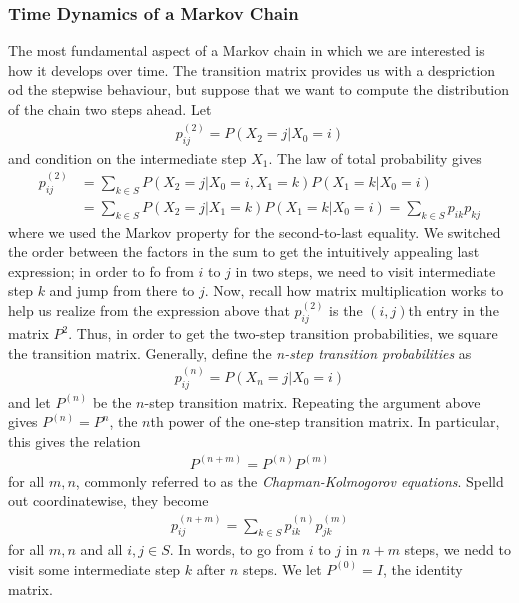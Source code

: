 \subsubsection{Time Dynamics of a Markov Chain}
The most fundamental aspect of a Markov chain in which we are interested is how it develops over time.
The transition matrix provides us with a despriction od the stepwise behaviour, but suppose that we want to compute the distribution of the chain two steps ahead. Let
\begin{align*}
  p_{ij}^{(2)} = P(X_2 = j | X_0 = i)
\end{align*}
and condition on the intermediate step $X_1$. The law of total probability gives
\begin{align*}
  p_{ij}^{(2)} &= \sum_{k \in S} P(X_2 = j | X_0 = i, X_1 = k)
  P(X_1 = k | X_0 = i) \\
  &=\sum_{k \in S} P(X_2 = j | X_1 = k) P(X_1 = k | X_0 = i) =
  \sum_{k \in S} p_{ik}p_{kj}
\end{align*}
where we used the Markov property for the second-to-last equality. We switched the order between the factors in the sum to get the intuitively appealing last expression; in order to fo from $i$ to $j$ in two steps, we need to visit intermediate step $k$ and jump from there to $j$. Now, recall how matrix multiplication works to help us realize from the expression above that $p_{ij}^{(2)}$ is the $(i, j)$th entry in the matrix $P^2$. Thus, in order to get the two-step transition probabilities, we square the transition matrix. Generally, define the \textit{n-step transition probabilities} as
\begin{align*}
  p_{ij}^{(n)} = P(X_n = j | X_0 = i)
\end{align*}
and let $P^{(n)}$ be the $n$-step transition matrix. Repeating the argument above gives $P^{(n)} = P^n$, the $n$th power of the one-step transition matrix. In particular, this gives the relation
\begin{align*}
  P^{(n + m)} = P^{(n)}P^{(m)}
\end{align*}
for all $m, n$, commonly referred to as the \textit{Chapman-Kolmogorov equations}. Spelld out coordinatewise, they become
\begin{align*}
  p_{ij}^{(n + m)} =  \sum_{k \in S} p_{ik}^{(n)}p_{jk}^{(m)}
\end{align*}
for all $m, n$ and all $i,j \in S$. In words, to go from $i$ to $j$ in $n + m$ steps, we nedd to visit some intermediate step $k$ after $n$ steps. We let $P^{(0)} = I$, the identity matrix.

